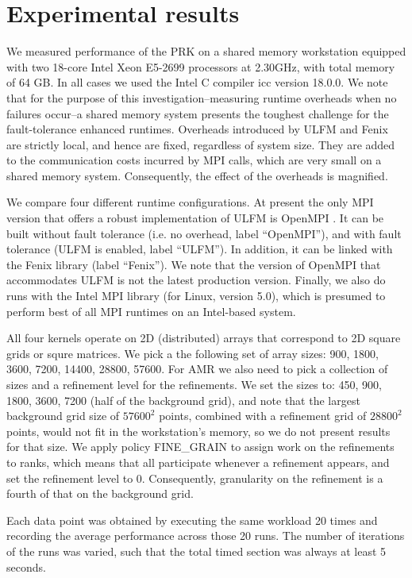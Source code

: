 \section{Experimental results}\label{sec:results}
We measured performance of the PRK on a shared memory workstation
equipped with two 18-core
Intel\regtm{} Xeon\regtm{} E5-2699 processors at 2.30GHz,
with total memory of 64 GB.
In all cases we used the Intel\regtm{} C compiler icc
version 18.0.0.
We note that for the purpose of this investigation--measuring runtime
overheads when no failures occur--a shared memory system
presents the toughest challenge for the fault-tolerance enhanced runtimes.
Overheads introduced by ULFM and Fenix are strictly local, and hence
are fixed, regardless of system size.
They are added to the communication costs incurred by MPI calls, which are
very small on a shared memory system.
Consequently, the effect of the overheads is magnified.

We compare four different runtime configurations.
At present the only MPI version that offers a robust implementation of ULFM
is OpenMPI \cite{openmpi}.
It can be built without fault tolerance (i.e. no overhead, label ``OpenMPI''), and with
fault tolerance (ULFM is enabled, label ``ULFM'').
In addition, it can be linked with the Fenix library (label ``Fenix'').
We note that the version of OpenMPI that accommodates ULFM is not the latest production
version.
Finally, we also do runs with the Intel\regtm{} MPI library (for Linux, version 5.0),
which is presumed to perform best of all MPI runtimes on an Intel-based system.

All four kernels operate on 2D (distributed) arrays that correspond to 2D square grids or
squre matrices.
We pick a the following set of array sizes: 900, 1800, 3600, 7200, 14400, 28800,
57600.
For AMR we also need to pick a collection of sizes and a refinement level for the refinements.
We set the sizes to: 450, 900, 1800, 3600, 7200 (half of the background grid), and note that the largest background
grid size of $57600^2$ points, combined with a refinement grid of $28800^2$
points, would not fit in the workstation's memory, so we do not present results
for that size.
We apply policy FINE\_GRAIN to assign work on the refinements to ranks, which
means that all participate whenever a refinement appears, and set the refinement level to 0.
Consequently, granularity on the refinement is a fourth of that on the background grid.

Each data point was obtained by executing the same workload 20 times and recording the
average performance across those 20 runs.
The number of iterations of the runs was varied, such that the total timed
section was always at least 5 seconds.

